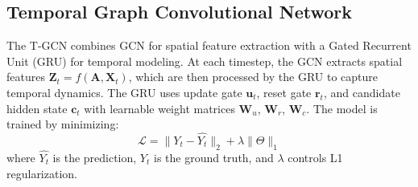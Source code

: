 \subsection{Temporal Graph Convolutional Network}

The T-GCN \citep{zhao2019t} combines GCN for spatial feature extraction with a Gated Recurrent Unit (GRU) for temporal modeling. At each timestep, the GCN extracts spatial features $\mathbf{Z}_t=f(\mathbf{A},\mathbf{X}_t)$, which are then processed by the GRU to capture temporal dynamics. The GRU uses update gate $\mathbf{u}_t$, reset gate $\mathbf{r}_t$, and candidate hidden state $\mathbf{c}_t$ with learnable weight matrices $\mathbf{W}_u$, $\mathbf{W}_r$, $\mathbf{W}_c$. The model is trained by minimizing:
\begin{equation}
\mathcal{L}=\| Y_{t}-\widehat{Y_{t}}\|_2+\lambda \|\Theta\|_1
\end{equation}
where $\widehat{Y_{t}}$ is the prediction, $Y_t$ is the ground truth, and $\lambda$ controls L1 regularization.
